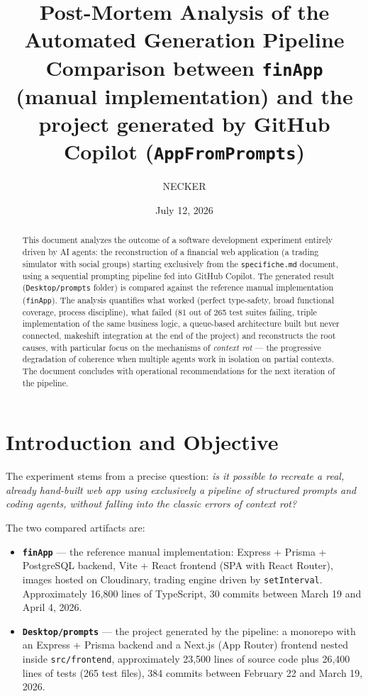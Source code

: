 \documentclass[11pt,a4paper]{article}
\title{\textbf{Post-Mortem Analysis of the Automated Generation Pipeline}\\[4pt]
	\Large Comparison between \texttt{finApp} (manual implementation) and the\\
	project generated by GitHub Copilot (\texttt{AppFromPrompts})}
\author{NECKER}
\date{July 12, 2026}
\newcommand{\file}[1]{\texttt{\small #1}}
\begin{document}
	\maketitle
	
	\begin{abstract}
		\noindent This document analyzes the outcome of a software development experiment entirely driven by AI agents: the reconstruction of a financial web application (a trading simulator with social groups) starting exclusively from the \file{specifiche.md} document, using a sequential prompting pipeline fed into GitHub Copilot. The generated result (\file{Desktop/prompts} folder) is compared against the reference manual implementation (\file{finApp}). The analysis quantifies what worked (perfect type-safety, broad functional coverage, process discipline), what failed (81 out of 265 test suites failing, triple implementation of the same business logic, a queue-based architecture built but never connected, makeshift integration at the end of the project) and reconstructs the root causes, with particular focus on the mechanisms of \emph{context rot} --- the progressive degradation of coherence when multiple agents work in isolation on partial contexts. The document concludes with operational recommendations for the next iteration of the pipeline.
	\end{abstract}
	
	\tableofcontents
	\newpage
	
	\section{Introduction and Objective}
	
	The experiment stems from a precise question: \emph{is it possible to recreate a real, already hand-built web app using exclusively a pipeline of structured prompts and coding agents, without falling into the classic errors of context rot?}
	
	The two compared artifacts are:
	
	\begin{itemize}[leftmargin=1.5em]
		\item \textbf{\file{finApp}} --- the reference manual implementation: Express + Prisma + PostgreSQL backend, Vite + React frontend (SPA with React Router), images hosted on Cloudinary, trading engine driven by \file{setInterval}. Approximately 16,800 lines of TypeScript, 30 commits between March 19 and April 4, 2026.
		\item \textbf{\file{Desktop/prompts}} --- the project generated by the pipeline: a monorepo with an Express + Prisma backend and a Next.js (App Router) frontend nested inside \file{src/frontend}, approximately 23,500 lines of source code plus 26,400 lines of tests (265 test files), 384 commits between February 22 and March 19, 2026.
	\end{itemize}
	
\end{document}
